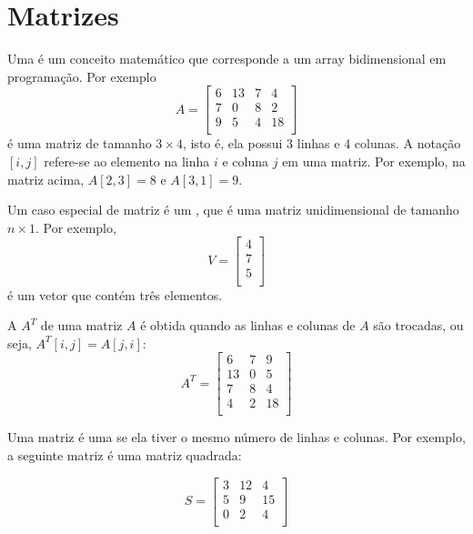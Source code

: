 \chapter{Matrizes}


Uma  é um conceito matemático
que corresponde a um array bidimensional
em programação. Por exemplo
\[
A = 
 \begin{bmatrix}
  6 & 13 & 7 & 4 \\
  7 & 0 & 8 & 2 \\
  9 & 5 & 4 & 18 \\
 \end{bmatrix}
\]
é uma matriz de tamanho $3 \times 4$, isto é,
ela possui 3 linhas e 4 colunas.
A notação $[i,j]$ refere-se
ao elemento na linha $i$ e coluna $j$
em uma matriz.
Por exemplo, na matriz acima,
$A[2,3]=8$ e $A[3,1]=9$.


Um caso especial de matriz é um ,
que é uma matriz unidimensional de tamanho $n \times 1$.
Por exemplo,
\[
V =
\begin{bmatrix}
4 \\
7 \\
5 \\
\end{bmatrix}
\]
é um vetor que contém três elementos.


A  $A^T$ de uma matriz $A$
é obtida quando as linhas e colunas de $A$
são trocadas, ou seja, $A^T[i,j]=A[j,i]$:
\[
A^T = 
 \begin{bmatrix}
  6 & 7 & 9 \\
  13 & 0 & 5 \\
  7 & 8 & 4 \\
  4 & 2 & 18 \\
 \end{bmatrix}
\]


Uma matriz é uma  se ela
tiver o mesmo número de linhas e colunas.
Por exemplo, a seguinte matriz é uma
matriz quadrada:

\[
S = 
 \begin{bmatrix}
  3 & 12 & 4  \\
  5 & 9 & 15  \\
  0 & 2 & 4 \\
 \end{bmatrix}
\]

